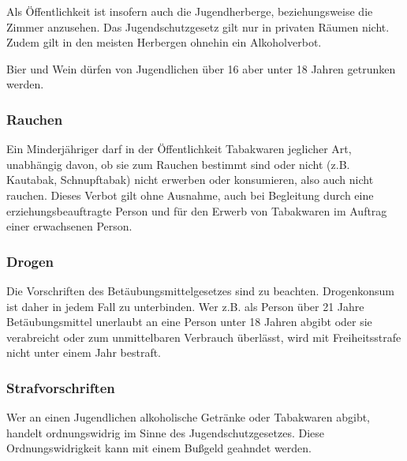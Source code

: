 \documentclass[a4paper,11pt]{scrartcl} %
\begin{document}
Als Öffentlichkeit ist insofern auch die Jugendherberge, beziehungsweise die Zimmer anzusehen. Das Jugendschutzgesetz gilt nur in privaten Räumen nicht. Zudem gilt in den meisten Herbergen ohnehin ein Alkoholverbot.

Bier und Wein dürfen von Jugendlichen über 16 aber unter 18 Jahren getrunken werden.

\subsubsection*{Rauchen}

Ein Minderjähriger darf in der Öffentlichkeit Tabakwaren jeglicher Art, unabhängig davon, ob sie zum Rauchen bestimmt sind oder nicht (z.B. Kautabak, Schnupftabak) nicht erwerben oder konsumieren, also auch nicht rauchen. Dieses Verbot gilt ohne Ausnahme, auch bei Begleitung durch eine erziehungsbeauftragte Person und für den Erwerb von Tabakwaren im Auftrag einer erwachsenen Person.

\subsubsection*{Drogen}

Die Vorschriften des Betäubungsmittelgesetzes sind zu beachten. Drogenkonsum ist daher in jedem Fall zu unterbinden. Wer z.B. als Person über 21 Jahre Betäubungsmittel unerlaubt an eine Person unter 18 Jahren abgibt oder sie verabreicht oder zum unmittelbaren Verbrauch überlässt, wird mit Freiheitsstrafe nicht unter einem Jahr bestraft.

\subsubsection*{Strafvorschriften}

Wer an einen Jugendlichen alkoholische Getränke oder Tabakwaren abgibt, handelt ordnungswidrig im Sinne des Jugendschutzgesetzes. Diese Ordnungswidrigkeit kann mit einem Bußgeld geahndet werden.
	
\end{document}
